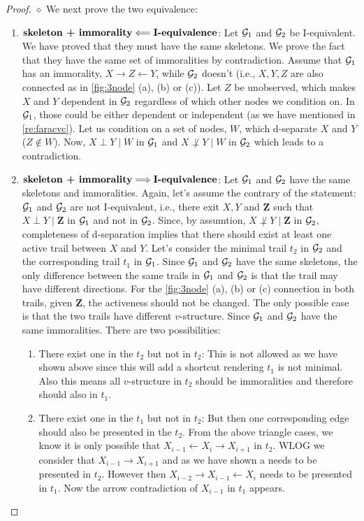 \documentclass{article}
\begin{document}
\begin{proof}
$\diamond$ We next prove the two equivalence:
\begin{enumerate}
    \item $\text{\textbf{skeleton + immorality}} \Longleftarrow \text{\textbf{I-equivalence}}$: Let $\mathcal{G}_1$ and $\mathcal{G}_2$ be I-equivalent. We have proved that they must have the same skeletons. We prove the fact that they have the same set of immoralities by contradiction. Assume that $\mathcal{G}_1$ has an immorality, $X \rightarrow Z \leftarrow Y$, while $\mathcal{G}_2$ doesn't (i.e., $X, Y, Z$ are also connected as in \cref{fig:3node} (a), (b) or (c)). Let $Z$ be unobserved, which makes $X$ and $Y$ dependent in $\mathcal{G}_2$ regardless of which other nodes we condition on. In $\mathcal{G}_1$, those could be either dependent or independent (as we have mentioned in \cref{re:faracvc}). Let us condition on a set of nodes, $W$, which d-separate $X$ and $Y$ ($Z \notin W$). Now, $X \perp Y \mid W$ in $\mathcal{G}_1$ and $X \not \perp Y \mid W$ in $\mathcal{G}_2$ which leads to a contradiction.
\item $\text{\textbf{skeleton + immorality}} \Longrightarrow \text{\textbf{I-equivalence}}$: Let $\mathcal{G}_1$ and $\mathcal{G}_2$ have the same skeletons and immoralities. Again, let's assume the contrary of the statement: $\mathcal{G}_1$ and $\mathcal{G}_2$ are not I-equivalent, i.e., there exit $X, Y$ and $\boldsymbol{Z}$ such that $X \perp Y \mid \boldsymbol{Z}$ in $\mathcal{G}_1$ and not in $\mathcal{G}_2$.
Since, by assumtion, $X \not \perp Y \mid \boldsymbol{Z}$ in $\mathcal{G}_2$, completeness of d-separation implies that there should exist at least one active trail between $X$ and $Y$. Let's consider the minimal trail $t_2$ in $\mathcal{G}_2$ and the corresponding trail $t_1$ in $\mathcal{G}_1$.
Since $\mathcal{G}_1$ and $\mathcal{G}_2$ have the same skeletons, the only difference between the same trails in $\mathcal{G}_1$ and $\mathcal{G}_2$ is that the trail may have different directions. For the \cref{fig:3node} (a), (b) or (c) connection in both trails, given $\boldsymbol{Z}$, the activeness should not be changed. The only possible case is that the two trails have different $v$-structure. Since  $\mathcal{G}_1$ and $\mathcal{G}_2$ have the same immoralities. There are two possibilities: 
\begin{enumerate}
\item There exist one  in the $t_2$ but not in $t_2$: This is not allowed as we have shown above since this will add a shortcut rendering $t_1$ is not  minimal. Also this means all $v$-structure in $t_2$ should be immoralities and therefore should also in $t_1$.
    \item There exist one  in the $t_1$ but not in $t_2$: But then one corresponding edge should also be presented in the  $t_2$. From the above triangle cases, we know it is only possible that  $X_{i-1} \leftarrow X_{i} \rightarrow X_{i+1}$ in $t_2$. WLOG we consider that $X_{i-1} \rightarrow X_{i+1}$ and as we have shown a   needs to be presented in $t_2$. However then $X_{i-2} \rightarrow X_{i-1}\leftarrow X_{i}$ needs to be presented in $t_1$. Now the arrow contradiction of $X_{i-1}$ in $t_1$ appears.

\end{enumerate}
\end{enumerate}
\end{proof}
\end{document}
